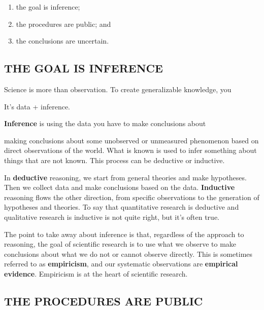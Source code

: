 \documentclass[justified,twoside,symmetric,]{tufte-book}
\providecommand{\tightlist}{%
  \setlength{\itemsep}{0pt}\setlength{\parskip}{0pt}}
\begin{document}
\begin{enumerate}
\def\labelenumi{\arabic{enumi}.}
\tightlist
\item
  the goal is inference;
\item
  the procedures are public; and
\item
  the conclusions are uncertain.
\end{enumerate}

\hypertarget{the-goal-is-inference}{%
\subsection*{THE GOAL IS INFERENCE}\label{the-goal-is-inference}}

Science is more than observation. To create generalizable knowledge, you

It's data + inference.

\textbf{Inference} is using the data you have to make conclusions about

making conclusions about some unobserved or unmeasured phenomenon based on direct observations of the world. What is known is used to infer something about things that are not known. This process can be deductive or inductive.

In \textbf{deductive} reasoning, we start from general theories and make hypotheses. Then we collect data and make conclusions based on the data. \textbf{Inductive} reasoning flows the other direction, from specific observations to the generation of hypotheses and theories. To say that quantitative research is deductive and qualitative research is inductive is not quite right, but it's often true.

The point to take away about inference is that, regardless of the approach to reasoning, the goal of scientific research is to use what we observe to make conclusions about what we do not or cannot observe directly. This is sometimes referred to as \textbf{empiricism}, and our systematic observations are \textbf{empirical evidence}. Empiricism is at the heart of scientific research.

\hypertarget{the-procedures-are-public}{%
\subsection*{THE PROCEDURES ARE PUBLIC}\label{the-procedures-are-public}}
\end{document}
